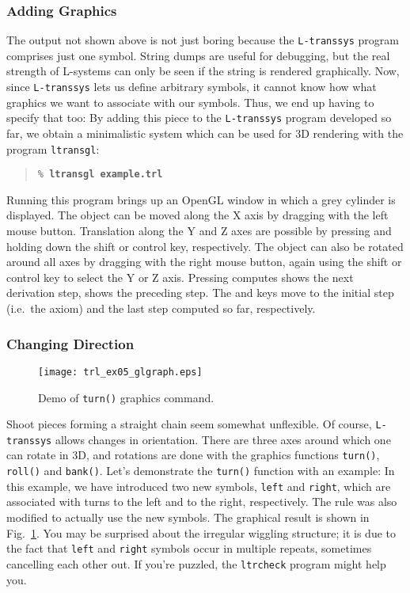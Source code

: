\documentclass[12pt]{article}
\newcommand{\transsys}{\texttt{transsys}}
\newcommand{\ltranssys}{\texttt{L-}\transsys}
\newcommand{\codeword}[1]{\texttt{#1}}
\newcommand{\prgname}[1]{\texttt{#1}}
\newcommand{\cmdline}[2][\% ]{\texttt{#1\textbf{#2}}}
\newcommand{\keyboardin}[1]{\fbox{\texttt{#1}}}
\begin{document}
\subsubsection{Adding Graphics}

The output not shown above is not just boring because the \ltranssys{}
program comprises just one symbol. String dumps are useful for
debugging, but the real strength of L-systems can only be seen if the
string is rendered graphically. Now, since \ltranssys{} lets us define
arbitrary symbols, it cannot know how what graphics we want to
associate with our symbols. Thus, we end up having to specify that too:
By adding this piece to the \ltranssys{} program developed so far, we
obtain a minimalistic system which can be used for 3D rendering with
the program \prgname{ltransgl}:
\begin{quote}
\cmdline{ltransgl example.trl}
\end{quote}
Running this program brings up an OpenGL window in which a grey
cylinder is displayed. The object can be moved along the X axis by
dragging with the left mouse button. Translation along the Y and Z
axes are possible by pressing and holding down the shift or control
key, respectively. The object can also be rotated around all axes by
dragging with the right mouse button, again using the shift or control
key to select the Y or Z axis. Pressing \keyboardin{n} computes shows
the next derivation step, \keyboardin{p} shows the preceding step. The
\keyboardin{Home} and \keyboardin{End} keys move to the initial step
(i.e.\ the axiom) and the last step computed so far, respectively.


\subsubsection{Changing Direction}

\begin{figure}
\centerline{
  \texttt{[image: trl\_ex05\_glgraph.eps]}
}
\caption{\label{fig_wiggle}
  Demo of \codeword{turn()} graphics command.
}
\end{figure}

Shoot pieces forming a straight chain seem somewhat unflexible. Of
course, \ltranssys{} allows changes in orientation. There are three
axes around which one can rotate in 3D, and rotations are done with
the graphics functions \codeword{turn()}, \codeword{roll()} and
\codeword{bank()}. Let's demonstrate the \codeword{turn()} function
with an example:
In this example, we have introduced two new symbols, \codeword{left}
and \codeword{right}, which are associated with turns to the left and
to the right, respectively. The rule was also modified to actually use
the new symbols. The graphical result is shown in Fig.\ \ref{fig_wiggle}.
You may be surprised about the irregular wiggling structure; it is due
to the fact that \codeword{left} and \codeword{right} symbols occur in
multiple repeats, sometimes cancelling each other out. If you're puzzled,
the \prgname{ltrcheck} program might help you.
\end{document}
